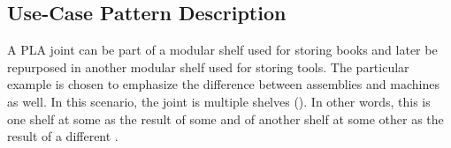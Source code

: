 \subsection*{Use-Case Pattern Description}
A PLA joint can be part of a modular shelf used for storing books and later be repurposed in another modular shelf used for storing tools. The particular example is chosen to emphasize the difference between assemblies and machines as well. In this scenario, the joint is  multiple shelves (). In other words, this  is  one  shelf at some  as the result of some  and  of another  shelf at some other  as the result of a different .